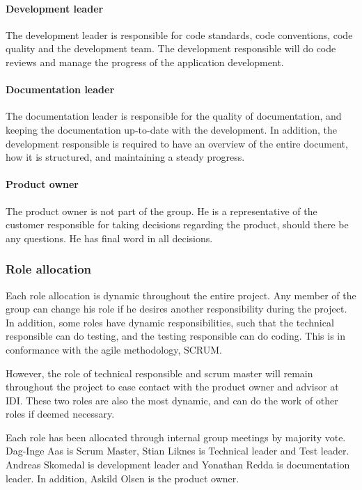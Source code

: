 \paragraph{\textbf{Development leader}}
The development leader is responsible for code standards, code conventions,
code quality and the development team. The development responsible will do code
reviews and manage the progress of the application development.

\paragraph{\textbf{Documentation leader}}
The documentation leader is responsible for the quality of documentation,
and keeping the documentation up-to-date with the development. In addition, the
development responsible is required to have an overview of the entire document,
how it is structured, and maintaining a steady progress.

\paragraph{\textbf{Product owner}}
The product owner is not part of the group. He is a representative of the
customer responsible for taking decisions regarding the product, should there be
any questions. He has final word in all decisions.

\subsubsection{Role allocation}
Each role allocation is dynamic throughout the entire project. Any member of the
group can change his role if he desires another responsibility during the
project. In addition, some roles have dynamic responsibilities, such that the
technical responsible can do testing, and the testing responsible can do coding.
This is in conformance with the agile methodology, SCRUM.

However, the role of technical responsible and scrum master will remain throughout the project to ease contact with the product owner and advisor at IDI. These two roles are also the most dynamic, and can do the work of other roles if deemed necessary.

Each role has been allocated through internal group meetings by majority vote.
Dag-Inge Aas is Scrum Master, Stian Liknes is Technical leader and Test
leader. Andreas Skomedal is development leader and Yonathan Redda is
documentation leader. In addition, Askild Olsen is the product owner.






